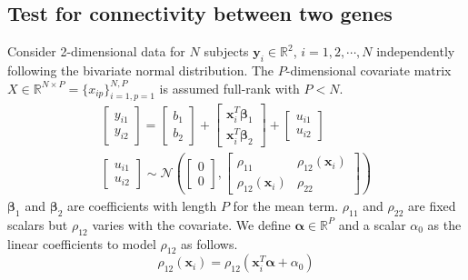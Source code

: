 \documentclass[aap,authoryear, preprint]{imsart}
\numberwithin{equation}{section}
\theoremstyle{plain}
\begin{document}
\subsection{Test for connectivity between two genes \label{sec:framework2}}
Consider 2-dimensional data for $N$ subjects $\bm{y}_i \in \mathbb{R}^2$, $i = 1, 2, \cdots, N$ independently following the bivariate normal distribution. The $P$-dimensional covariate matrix $X \in \mathbb{R}^{N \times P} = \{x_{ip}\}_{i=1,p=1}^{N,P}$ is assumed full-rank with $P < N$.
\begin{equation}
\begin{multlined}
    \begin{bmatrix} y_{i1} \\ y_{i2} \end{bmatrix} = 
    \begin{bmatrix} b_{1} \\ b_{2} \end{bmatrix} + 
    \begin{bmatrix} \bm{x}_i^T \bm{\beta}_1 \\ \bm{x}_i^T \bm{\beta}_2 \end{bmatrix} + 
    \begin{bmatrix} {u_{i1}} \\ {u_{i2}} \end{bmatrix}\\
    \begin{bmatrix} {u_{i1}} \\ u_{i2} \end{bmatrix} 
    \sim \mathcal{N}\left(
        \begin{bmatrix} 0 \\ 0 \end{bmatrix}, 
        \begin{bmatrix} \rho_{11} & \rho_{12}(\bm{x}_i) \\ 
        \rho_{12}(\bm{x}_i) & \rho_{22} \end{bmatrix}
    \right)
    \end{multlined}
    \label{eq:framework_2genes}
\end{equation}
$\bm{\beta}_1$ and $\bm{\beta}_2$ are coefficients with length $P$  for the mean term. $\rho_{11}$ and $\rho_{22}$ are fixed scalars but $\rho_{12}$ varies with the covariate. We define $\bm{\alpha} \in \mathbb{R}^{P}$ and a scalar $\alpha_0$ as the linear coefficients to model $\rho_{12}$ as follows.
\begin{equation}
    \rho_{12}(\bm{x}_i) = \rho_{12}(\bm{x}_i^T\bm{\alpha} + \alpha_0) \label{eq:rho}
\end{equation}
\end{document}
